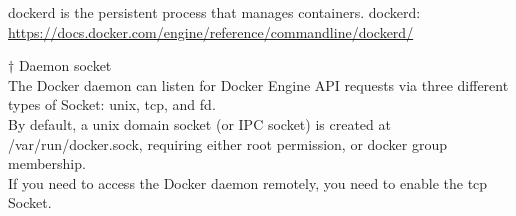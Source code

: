 \documentclass[10pt,a4j,openany,dvipdfmx]{jsarticle}
\begin{document}
\begin{tcolorbox}[
title=docker daemon(dockerd), fonttitle=\bfseries]
dockerd is the persistent process that manages containers. 
\tcblower
dockerd: \url{https://docs.docker.com/engine/reference/commandline/dockerd/}
\end{tcolorbox}

{\Large $\dagger$ Daemon socket}\\
The Docker daemon can listen for Docker Engine API requests via three different types of Socket: unix, tcp, and fd.\\

By default, a unix domain socket (or IPC socket) is created at /var/run/docker.sock,
 requiring either root permission, or docker group membership.\\

If you need to access the Docker daemon remotely, you need to enable the tcp Socket.\\





\end{document}
